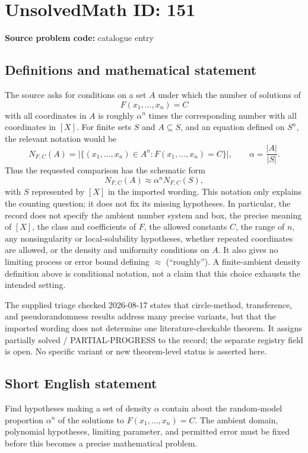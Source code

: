 \documentclass[11pt]{article}
\begin{document}
\section*{UnsolvedMath ID: 151}
\textbf{Source problem code:} catalogue entry
\subsection{Definitions and mathematical statement}
The source asks for conditions on a set $A$ under which the number of solutions of
\[F(x_1,\ldots,x_n)=C\]
with all coordinates in $A$ is roughly $\alpha^n$ times the corresponding number with all coordinates in $[X]$. For finite sets $S$ and $A\subseteq S$, and an equation defined on $S^n$, the relevant notation would be
\[N_{F,C}(A)=\bigl|\{(x_1,\ldots,x_n)\in A^n:F(x_1,\ldots,x_n)=C\}\bigr|,\qquad \alpha=\frac{|A|}{|S|}.\]
Thus the requested comparison has the schematic form
\[N_{F,C}(A)\approx \alpha^n N_{F,C}(S),\]
with $S$ represented by $[X]$ in the imported wording. This notation only explains the counting question; it does not fix its missing hypotheses. In particular, the record does not specify the ambient number system and box, the precise meaning of $[X]$, the class and coefficients of $F$, the allowed constants $C$, the range of $n$, any nonsingularity or local-solubility hypotheses, whether repeated coordinates are allowed, or the density and uniformity conditions on $A$. It also gives no limiting process or error bound defining $\approx$ (``roughly''). A finite-ambient density definition above is conditional notation, not a claim that this choice exhausts the intended setting.

The supplied triage checked 2026-08-17 states that circle-method, transference, and pseudorandomness results address many precise variants, but that the imported wording does not determine one literature-checkable theorem. It assigns partially solved / PARTIAL-PROGRESS to the record; the separate registry field is open. No specific variant or new theorem-level status is asserted here.
\subsection{Short English statement}
Find hypotheses making a set of density $\alpha$ contain about the random-model proportion $\alpha^n$ of the solutions to $F(x_1,\ldots,x_n)=C$. The ambient domain, polynomial hypotheses, limiting parameter, and permitted error must be fixed before this becomes a precise mathematical problem.
\end{document}
